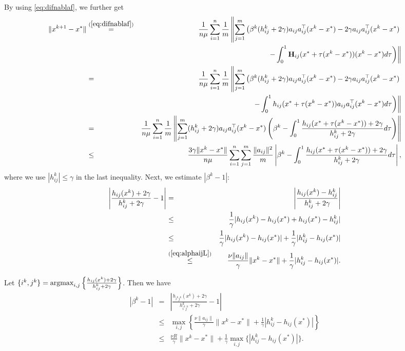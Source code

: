 \documentclass[12pt]{article}
\newcommand{\newalpha}{h}
\newcommand{\mH}{\mathbf{H}}
\begin{document}
By using 	\eqref{eq:difnablaf}, we further get
\begin{eqnarray*}
	\|x^{k+1} - x^*\|
	&\overset{(\ref{eq:difnablaf})}{=}& \frac{1}{n \mu} \sum_{i=1}^n \frac{1}{m} \left\|  \sum_{j=1}^{m} \left( \beta^k (h_{ij}^k + 2\gamma)a_{ij}a_{ij}^\top (x^k - x^*) - 2\gamma a_{ij}a_{ij}^\top (x^k - x^*) \right. \right. \\ 
	&& \left. \left. -  \int_{0}^1 \mH_{ij} (x^* + \tau(x^k - x^*)) (x^k - x^*)d\tau  \right)   \right\| \\ 
	&=& \frac{1}{n \mu} \sum_{i=1}^n \frac{1}{m} \left\|  \sum_{j=1}^{m} \left( \beta^k (h_{ij}^k + 2\gamma)a_{ij}a_{ij}^\top (x^k - x^*) - 2\gamma a_{ij}a_{ij}^\top (x^k - x^*) \right. \right. \\ 
	&& \left. \left. -  \int_{0}^1 \newalpha_{ij} (x^* + \tau(x^k - x^*))a_{ij}a_{ij}^\top (x^k - x^*)d\tau  \right)   \right\| \\ 
	&=& \frac{1}{n \mu} \sum_{i=1}^n \frac{1}{m} \left\|  \sum_{j=1}^{m}  (h_{ij}^k + 2\gamma)a_{ij}a_{ij}^\top (x^k - x^*) \left( \beta^k - \int_{0}^1 \frac{\newalpha_{ij}(x^* + \tau(x^k - x^*)) + 2\gamma}{ h_{ij}^k + 2\gamma} d\tau \right) \right\| \\ 
	&\leq& \frac{3\gamma\|x^k - x^*\|}{n \mu} \sum_{i=1}^n \sum_{j=1}^{m} \frac{\|a_{ij}\|^2}{m} \left|   \beta^k - \int_{0}^1 \frac{\newalpha_{ij}(x^* + \tau(x^k - x^*)) + 2\gamma}{ h_{ij}^k + 2\gamma} d\tau   \right|, 
\end{eqnarray*}
where we use $|h_{ij}^k| \leq \gamma$ in the last inequality. Next, we estimate $|\beta^k - 1|$:
\begin{eqnarray*}
	\left|  \frac{\newalpha_{ij}(x^k) + 2\gamma}{h_{ij}^k + 2\gamma}  - 1  \right| &=& \left|  \frac{\newalpha_{ij}(x^k) - h_{ij}^k}{h_{ij}^k + 2\gamma}  \right| \\ 
	&\leq& \frac{1}{\gamma} |\newalpha_{ij}(x^k) - \newalpha_{ij}(x^*) + \newalpha_{ij}(x^*) - h_{ij}^k| \\ 
	&\leq& \frac{1}{\gamma} |\newalpha_{ij}(x^k) - \newalpha_{ij}(x^*)| + \frac{1}{\gamma} |h_{ij}^k - \newalpha_{ij}(x^*)| \\ 
	&\overset{(\ref{eq:alphaijL})}{\leq}& \frac{\nu \|a_{ij}\|}{\gamma} \|x^k - x^*\| + \frac{1}{\gamma} |h_{ij}^k - \newalpha_{ij}(x^*)|. 
\end{eqnarray*}



Let $\{i^k, j^k\} = {\rm argmax}_{i, j} \left\{ \frac{\newalpha_{ij}(x^k) + 2\gamma}{h_{ij}^k + 2\gamma}  \right\}$. Then we have 
\begin{eqnarray*}
	|\beta^k - 1| &=& \left| \frac{\newalpha_{i^kj^k}(x^k) + 2\gamma}{h_{i^kj^k}^k + 2\gamma}   - 1  \right| \\ 
	&\leq& \max_{i, j} \left\{  \frac{\nu \|a_{ij}\|}{\gamma} \|x^k - x^*\| + \frac{1}{\gamma} |h_{ij}^k - \newalpha_{ij}(x^*)|  \right\} \\ 
	&\leq& \frac{\nu R}{\gamma} \|x^k - x^*\| + \frac{1}{\gamma} \max_{i, j} \{|h_{ij}^k - \newalpha_{ij}(x^*)| \}.  
\end{eqnarray*}
\end{document}
